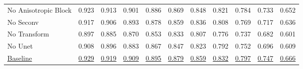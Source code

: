 \begin{table}[!hbt]
\begin{tabular}{lcccccccccc}
    No Anisotropic Block & 0.923 & 0.913 & 0.901 & 0.886 & 0.869 & 0.848 & 0.821 & 0.784 & 0.733 & 0.652 \\
    No Seconv & 0.917 & 0.906 & 0.893 & 0.878 & 0.859 & 0.836 & 0.808 & 0.769 & 0.717 & 0.636 \\
    No Transform & 0.897 & 0.885 & 0.870 & 0.853 & 0.833 & 0.807 & 0.776 & 0.737 & 0.682 & 0.601 \\
    No Unet & 0.908 & 0.896 & 0.883 & 0.867 & 0.847 & 0.823 & 0.792 & 0.752 & 0.696 & 0.609 \\
    \underline{Baseline} & \underline{0.929} & \underline{0.919} & \underline{0.909} & \underline{0.895} & \underline{0.879} & \underline{0.859} & \underline{0.832} & \underline{0.797} & \underline{0.747} & \underline{0.666} \\
    \bottomrule
    \end{tabular}
\end{table}